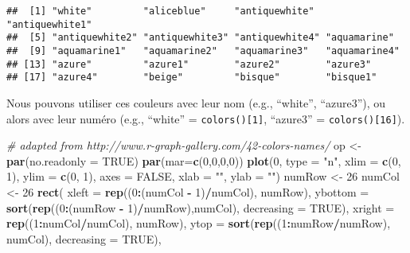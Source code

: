 \documentclass[]{book}
\newenvironment{Shaded}{\begin{snugshade}}{\end{snugshade}}
\newcommand{\KeywordTok}[1]{\textcolor[rgb]{0.13,0.29,0.53}{\textbf{#1}}}
\newcommand{\DataTypeTok}[1]{\textcolor[rgb]{0.13,0.29,0.53}{#1}}
\newcommand{\DecValTok}[1]{\textcolor[rgb]{0.00,0.00,0.81}{#1}}
\newcommand{\StringTok}[1]{\textcolor[rgb]{0.31,0.60,0.02}{#1}}
\newcommand{\CommentTok}[1]{\textcolor[rgb]{0.56,0.35,0.01}{\textit{#1}}}
\newcommand{\OtherTok}[1]{\textcolor[rgb]{0.56,0.35,0.01}{#1}}
\newcommand{\OperatorTok}[1]{\textcolor[rgb]{0.81,0.36,0.00}{\textbf{#1}}}
\newcommand{\NormalTok}[1]{#1}
\theoremstyle{definition}
\theoremstyle{definition}
\theoremstyle{definition}
\theoremstyle{remark}
\begin{document}
\begin{verbatim}
##  [1] "white"         "aliceblue"     "antiquewhite"  "antiquewhite1"
##  [5] "antiquewhite2" "antiquewhite3" "antiquewhite4" "aquamarine"   
##  [9] "aquamarine1"   "aquamarine2"   "aquamarine3"   "aquamarine4"  
## [13] "azure"         "azure1"        "azure2"        "azure3"       
## [17] "azure4"        "beige"         "bisque"        "bisque1"
\end{verbatim}

Nous pouvons utiliser ces couleurs avec leur nom (e.g., ``white'',
``azure3''), ou alors avec leur numéro (e.g., ``white'' =
\texttt{colors(){[}1{]}}, ``azure3'' = \texttt{colors(){[}16{]}}).

\begin{Shaded}
\begin{Highlighting}[]
\CommentTok{# adapted from http://www.r-graph-gallery.com/42-colors-names/}
\NormalTok{op <-}\StringTok{ }\KeywordTok{par}\NormalTok{(}\DataTypeTok{no.readonly =} \OtherTok{TRUE}\NormalTok{)}
\KeywordTok{par}\NormalTok{(}\DataTypeTok{mar=}\KeywordTok{c}\NormalTok{(}\DecValTok{0}\NormalTok{,}\DecValTok{0}\NormalTok{,}\DecValTok{0}\NormalTok{,}\DecValTok{0}\NormalTok{))}
\KeywordTok{plot}\NormalTok{(}\DecValTok{0}\NormalTok{, }\DataTypeTok{type =} \StringTok{"n"}\NormalTok{, }\DataTypeTok{xlim =} \KeywordTok{c}\NormalTok{(}\DecValTok{0}\NormalTok{, }\DecValTok{1}\NormalTok{), }\DataTypeTok{ylim =} \KeywordTok{c}\NormalTok{(}\DecValTok{0}\NormalTok{, }\DecValTok{1}\NormalTok{), }
  \DataTypeTok{axes =} \OtherTok{FALSE}\NormalTok{, }\DataTypeTok{xlab =} \StringTok{""}\NormalTok{, }\DataTypeTok{ylab =} \StringTok{""}\NormalTok{)}
\NormalTok{numRow <-}\StringTok{ }\DecValTok{26}
\NormalTok{numCol <-}\StringTok{ }\DecValTok{26}
\KeywordTok{rect}\NormalTok{(}
  \DataTypeTok{xleft =} \KeywordTok{rep}\NormalTok{((}\DecValTok{0}\OperatorTok{:}\NormalTok{(numCol }\OperatorTok{-}\StringTok{ }\DecValTok{1}\NormalTok{)}\OperatorTok{/}\NormalTok{numCol), numRow),  }
  \DataTypeTok{ybottom =} \KeywordTok{sort}\NormalTok{(}\KeywordTok{rep}\NormalTok{((}\DecValTok{0}\OperatorTok{:}\NormalTok{(numRow }\OperatorTok{-}\StringTok{ }\DecValTok{1}\NormalTok{)}\OperatorTok{/}\NormalTok{numRow),numCol), }\DataTypeTok{decreasing =} \OtherTok{TRUE}\NormalTok{),}
  \DataTypeTok{xright =} \KeywordTok{rep}\NormalTok{((}\DecValTok{1}\OperatorTok{:}\NormalTok{numCol}\OperatorTok{/}\NormalTok{numCol), numRow),}
  \DataTypeTok{ytop =} \KeywordTok{sort}\NormalTok{(}\KeywordTok{rep}\NormalTok{((}\DecValTok{1}\OperatorTok{:}\NormalTok{numRow}\OperatorTok{/}\NormalTok{numRow), numCol), }\DataTypeTok{decreasing =} \OtherTok{TRUE}\NormalTok{),}

\end{Highlighting}
\end{Shaded}
\end{document}
